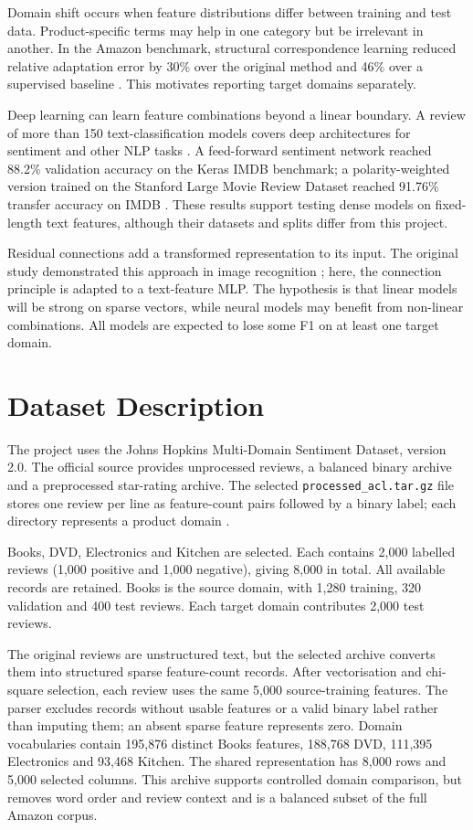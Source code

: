 \documentclass[11pt,a4paper]{article}
\begin{document}
Domain shift occurs when feature distributions differ between training and test data. Product-specific terms may help in one category but be irrelevant in another. In the Amazon benchmark, structural correspondence learning reduced relative adaptation error by 30\% over the original method and 46\% over a supervised baseline \cite{blitzer}. This motivates reporting target domains separately.

Deep learning can learn feature combinations beyond a linear boundary. A review of more than 150 text-classification models covers deep architectures for sentiment and other NLP tasks \cite{minaee}. A feed-forward sentiment network reached 88.2\% validation accuracy on the Keras IMDB benchmark; a polarity-weighted version trained on the Stanford Large Movie Review Dataset reached 91.76\% transfer accuracy on IMDB \cite{vassilev}. These results support testing dense models on fixed-length text features, although their datasets and splits differ from this project.

Residual connections add a transformed representation to its input. The original study demonstrated this approach in image recognition \cite{he}; here, the connection principle is adapted to a text-feature MLP. The hypothesis is that linear models will be strong on sparse vectors, while neural models may benefit from non-linear combinations. All models are expected to lose some F1 on at least one target domain.

\section{Dataset Description}
The project uses the Johns Hopkins Multi-Domain Sentiment Dataset, version 2.0. The official source provides unprocessed reviews, a balanced binary archive and a preprocessed star-rating archive. The selected \texttt{processed\_acl.tar.gz} file stores one review per line as feature-count pairs followed by a binary label; each directory represents a product domain \cite{jhu}.

Books, DVD, Electronics and Kitchen are selected. Each contains 2,000 labelled reviews (1,000 positive and 1,000 negative), giving 8,000 in total. All available records are retained. Books is the source domain, with 1,280 training, 320 validation and 400 test reviews. Each target domain contributes 2,000 test reviews.

The original reviews are unstructured text, but the selected archive converts them into structured sparse feature-count records. After vectorisation and chi-square selection, each review uses the same 5,000 source-training features. The parser excludes records without usable features or a valid binary label rather than imputing them; an absent sparse feature represents zero. Domain vocabularies contain 195,876 distinct Books features, 188,768 DVD, 111,395 Electronics and 93,468 Kitchen. The shared representation has 8,000 rows and 5,000 selected columns. This archive supports controlled domain comparison, but removes word order and review context and is a balanced subset of the full Amazon corpus.
\end{document}
